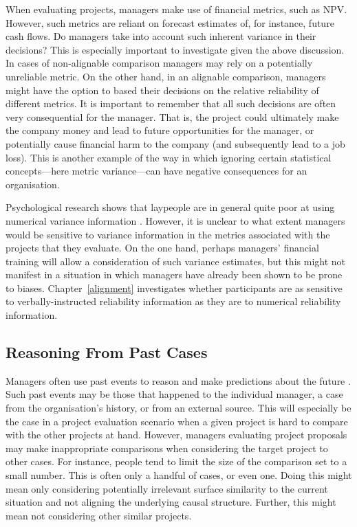 \documentclass[a4paper, nobind]{templates/ociamthesis}
\theoremstyle{definition}
\theoremstyle{definition}
\theoremstyle{definition}
\theoremstyle{definition}
\theoremstyle{remark}
\begin{document}
When evaluating projects, managers make use of financial metrics, such as NPV.
However, such metrics are reliant on forecast estimates of, for instance, future
cash flows. Do managers take into account such inherent variance in their
decisions? This is especially important to investigate given the above
discussion. In cases of non-alignable comparison managers may rely on a
potentially unreliable metric. On the other hand, in an alignable comparison,
managers might have the option to based their decisions on the relative
reliability of different metrics. It is important to remember that all such
decisions are often very consequential for the manager. That is, the project
could ultimately make the company money and lead to future opportunities for the
manager, or potentially cause financial harm to the company (and subsequently
lead to a job loss). This is another example of the way in which ignoring
certain statistical concepts---here metric variance---can have negative
consequences for an organisation.

Psychological research shows that laypeople are in general quite poor at using
numerical variance information \autocite{galesic2010,konold1993,vivalt2021,batteux2020}. However, it is unclear to what extent managers would be sensitive
to variance information in the metrics associated with the projects that they
evaluate. On the one hand, perhaps managers' financial training will allow a
consideration of such variance estimates, but this might not manifest in a
situation in which managers have already been shown to be prone to biases.
Chapter~\ref{alignment} investigates whether participants are as sensitive to
verbally-instructed reliability information as they are to numerical reliability
information.

\subsection{Reasoning From Past Cases}

Managers often use past events to reason and make predictions about the future
\autocite{einhorn1987}. Such past events may be those that happened to the individual
manager, a case from the organisation's history, or from an external source.
This will especially be the case in a project evaluation scenario when a given
project is hard to compare with the other projects at hand. However, managers
evaluating project proposals may make inappropriate comparisons when considering
the target project to other cases. For instance, people tend to limit the size
of the comparison set to a small number. This is often only a handful of cases,
or even one. Doing this might mean only considering potentially irrelevant
surface similarity to the current situation and not aligning the underlying
causal structure. Further, this might mean not considering other similar
projects.
\end{document}
